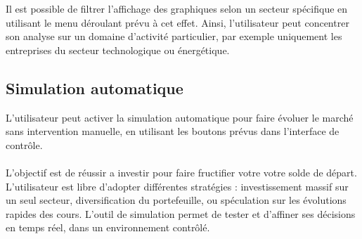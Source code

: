 Il est possible de filtrer l'affichage des graphiques selon un secteur spécifique en utilisant le menu déroulant prévu à cet effet.  
Ainsi, l’utilisateur peut concentrer son analyse sur un domaine d'activité particulier, par exemple uniquement les entreprises du secteur technologique ou énergétique.

\vspace{0.5cm}
\subsection{Simulation automatique}

L’utilisateur peut activer la simulation automatique pour faire évoluer le marché sans intervention manuelle, en utilisant les boutons prévus dans l'interface de contrôle.

\vspace{0.5cm}

\paragraph{} L'objectif est de réussir a investir pour faire fructifier votre votre solde de départ. L'utilisateur est libre d'adopter différentes stratégies : investissement massif sur un seul secteur, diversification du portefeuille, ou spéculation sur les évolutions rapides des cours.  
L'outil de simulation permet de tester et d'affiner ses décisions en temps réel, dans un environnement contrôlé.